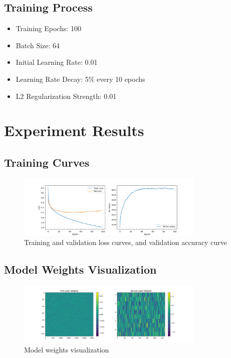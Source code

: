 \documentclass[12pt]{article}
\begin{document}
\subsection{Training Process}
\begin{itemize}
    \item Training Epochs: 100
    \item Batch Size: 64
    \item Initial Learning Rate: 0.01
    \item Learning Rate Decay: 5\% every 10 epochs
    \item L2 Regularization Strength: 0.01
\end{itemize}

\section{Experiment Results}

\subsection{Training Curves}
\begin{figure}[H]
    \centering
    \includegraphics[width=0.8\textwidth]{results/training_curves.png}
    \caption{Training and validation loss curves, and validation accuracy curve}
    \label{fig:training_curves}
\end{figure}

\subsection{Model Weights Visualization}
\begin{figure}[H]
    \centering
    \includegraphics[width=0.8\textwidth]{results/weights_visualization.png}
    \caption{Model weights visualization}
    \label{fig:weights}
\end{figure}
\end{document}
